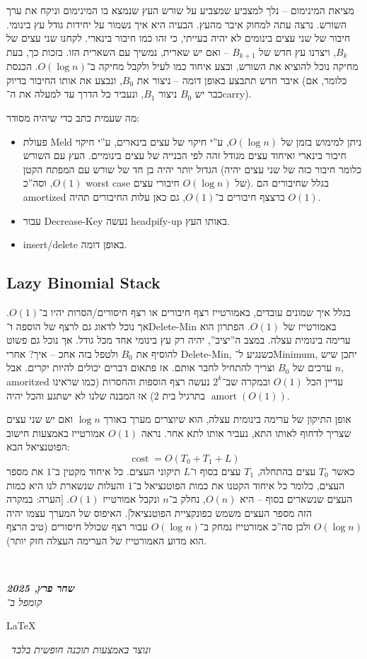 \documentclass[]{article}
\newcommand\en[1] {\begin{otherlanguage}{english}#1\end{otherlanguage}}
\newcommand\ndoc  {\dotfill \\ \vfil {\begin{center}
            {\textbf{\textit{שחר פרץ, 2025}} \\
                \scriptsize \textit{קומפל ב־}\en{\LaTeX}\,\textit{ ונוצר באמצעות תוכנה חופשית בלבד}}
    \end{center}} \vfil	}
\newcommand\logn  {\log n}
\theoremstyle{definition}
\DeclareMathOperator\amort   {amort}
\DeclareMathOperator\cost    {cost}
\begin{document}
    מציאת המינימום – נלך למצביע שמצביע על שורש העץ שנמצא בו המינימום וניקח את ערך השורש. נרצה עתה למחוק איבר מהעץ. הבעיה היא איך נשמור על יחידות גודל עץ בינומי. 
    חיבור של שני עצים בינומים לא יהיה בעייתי, כי זהו כמו חיבור בינארי. לקחנו שני עצים של $B_k$, ויצרנו עץ חדש של $B_{k + 1}$ – ואם יש שארית, נמשיך עם השארית הזו. בזכות כך, בעת מחיקה נוכל להוציא את השורש, ובצע איחוד כמו לעיל ולקבל מחיקה ב־$O(\logn)$. הכנסת איבר חדש תתבצע באופן דומה – ניצור את $B_0$, ונבצע את אותו החיבור בדיוק (כלומר, אם כבר יש $B_0$ ניצור $B_1$, ונעביר כל הדרך עד למעלה את ה־carry). 
    
    מה שעמית כתב כדי שיהיה מסודר: 
    \begin{itemize}
        \item פעולת Meld ניתן למימוש בזמן של $O(\logn)$, ע''י חיקוי של עצים בינארים, ע''י חיקוי חיבור בינארי ואיחוד עצים מגודל זהה לפי הבנייה של עצים בינומיים. העץ עם השורש הגדול יותר יהיה בן חד של שורש עם המפתח הקטן (כלומר חיבור כזה של שני עצים יהיה $O(1)$, וסה''כ worst case של $O(\logn)$ חיבורי עצים). בגלל שחיבורים הם amortized ברצצף חיבורים ב־$O(1)$, גם כאן עלות החיבורים תהיה $O(1)$. 
        \item עבור Decrease-Key נעשה headpify-up באותו העץ. 
        \item insert/delete באופן דומה. 
    \end{itemize}
    
    
    \subsection{Lazy Binomial Stack}
    בגלל איך שמונים עובדים, באמורטייז רצף חיבורים או רצף חיסורים/הסרות יהיו ב־$O(1)$. אך נוכל לדאוג גם לרצף של הוספה \textbf{ו}־Delete-Min באמורטייז של $O(1)$. הפתרון הוא ערימה בינומית עצלה. במצב ה''יציב'', יהיה רק עץ בינומי אחד מכל גודל. אך נוכל גם פשוט להוסיף את $B_0$ ולטפל בזה אחכ – איך? אחרי Delete-Min, כשנגיע ל־Minimum, יתכן שיש $n$ ערכים של $B_0$ וצריך להתחיל לחבר אותם. אז פתאום דברים יכולים להיות יקרים. אבל, amoritzed עדיין הכל $O(1)$ ובמקרה שב־$2^k$ נעשה רצף הוספות והחסרות (כמו שראינו בתרגיל בית 2) אז המבנה שלנו לא ישתגע והכל יהיה $\amort(O(1))$. 
   
    אופן התיקון של ערימה בינומית עצלה, הוא שיוצרים מערך באורך $\logn$ ואם יש שני עצים שצריך לדחוף לאותו התא, נעביר אותו לתא אחר. נראה $O(1)$ אמורטייז באמצעות חישוב הפוטנציאל הבא: 
    \[ \cost = O(T_0  +T_1 + L) \]
    כאשר $T_0$ עצים בהתחלה, $T_1$ עצים בסוף ו־$L$ תיקוני העצים. כל איחוד מקטין ב־$1$ את מספר העצים, כלומר כל איחוד הקטנו את כמות הפוטנציאל ב־$1$ והעלות שנשארת לנו היא כמות העצים שנשארים בסוף – היא $O(n)$, נחלק ב־$n$ ונקבל אמורטייז $O(1)$. [הערה: במקרה הזה מספר העצים משמש כפונקציית הפוטנציאל]. האיפוס של המערך עצמו יהיה $O(\logn)$ ולכן סה''כ אמורטייז נמחק ב־$O(\logn)$ עבור רצף שכולל חיסורים (טיב הרצף הוא מדוע האמורטייז של הערימה העצלה חזק יותר). 
    
    
    
    \ndoc
\end{document}
